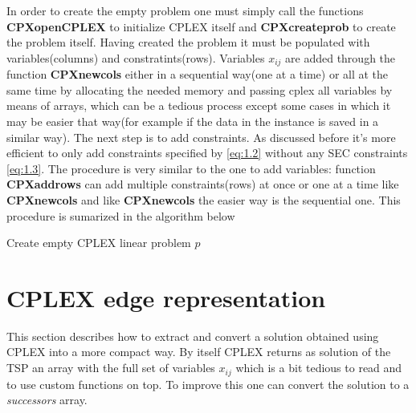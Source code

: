 In order to create the empty problem one must simply call the functions \textbf{CPXopenCPLEX} to initialize CPLEX itself and \textbf{CPXcreateprob} to create the problem itself.
Having created the problem it must be populated with variables(columns) and constratints(rows). Variables $x_{ij}$ are added through the function \textbf{CPXnewcols} either in a sequential way(one at a time) or all at the same time by allocating the needed memory and passing cplex all variables by means of arrays, which can be a tedious process except some cases in which it may be easier that way(for example if the data in the instance is saved in a similar way).
The next step is to add constraints. As discussed before it's more efficient to only add constraints specified by \eqref{eq:1.2} without any SEC constraints \eqref{eq:1.3}. The procedure is very similar to the one to add variables: function \textbf{CPXaddrows} can add multiple constraints(rows) at once or one at a time like \textbf{CPXnewcols} and like \textbf{CPXnewcols} the easier way is the sequential one.
This procedure is sumarized in the algorithm below

\begin{algorithm}[H]
	\vspace{2mm}
	Create empty CPLEX linear problem $p$\\
\end{algorithm}

\section{CPLEX edge representation}

This section describes how to extract and convert a solution obtained using CPLEX into a more compact way. 
By itself CPLEX returns as solution of the TSP an array with the full set of variables $x_{ij}$ which is a bit tedious to read and to use custom functions on top.
To improve this one can convert the solution to a \textit{successors} array. 

\begin{function}[H]
	\vspace{2mm}
\end{function}